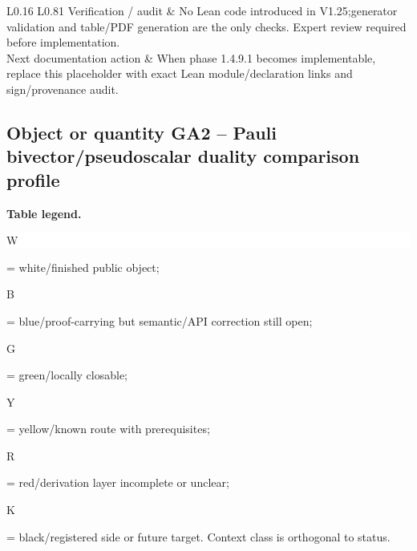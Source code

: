 \begin{longtable}{L{0.16\linewidth} L{0.81\linewidth}}
\hline\addlinespace[0.20em]
Verification /\allowbreak{} audit & No Lean code introduced in V1.25;\newline generator validation and table/\allowbreak{}PDF generation are the only checks. Expert review required before implementation.\\
\hline\addlinespace[0.20em]
Next documentation action & When phase 1.4.9.1 becomes implementable, replace this placeholder with exact Lean module/\allowbreak{}declaration links and sign/\allowbreak{}provenance audit.\\
\hline\addlinespace[0.20em]
\end{longtable}
\subsection*{Object or quantity GA2 -- Pauli bivector/\allowbreak{}pseudoscalar duality comparison profile}
\hypertarget{objproof:GA2}{}
\par\smallskip\noindent\begin{minipage}{0.99\linewidth}\footnotesize\raggedright\textbf{Table legend.} \colorbox{white}{\strut W} = white/finished public object; \colorbox{cyan!20}{\strut B} = blue/proof-carrying but semantic/API correction still open; \colorbox{green!18}{\strut G} = green/locally closable; \colorbox{yellow!25}{\strut Y} = yellow/known route with prerequisites; \colorbox{red!20}{\strut R} = red/derivation layer incomplete or unclear; \colorbox{black!18}{\strut K} = black/registered side or future target. Context class is orthogonal to status.\end{minipage}\par\vspace{0.25em}
